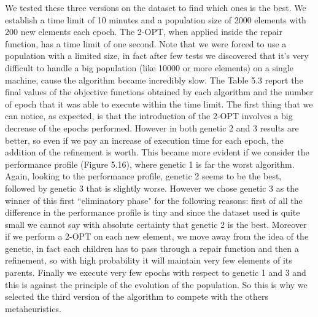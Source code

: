 \noindent We tested these three versions on the dataset to find which ones is the best. We establish a time limit of 10 minutes and a population size of 2000 elements with 200 new elements each epoch. The 2-OPT, when applied inside the repair function, has a time limit of one second. Note that we were forced to use a population with a limited size, in fact after few tests we discovered that it's very difficult to handle a big population (like 10000 or more elements) on a single machine, cause the algorithm became incredibly slow.
The Table 5.3 report the final values of the objective functions obtained by each algorithm and the number of epoch that it was able to execute within the time limit. The first thing that we can notice, as expected, is that the introduction of the 2-OPT involves a big decrease of the epochs performed. However in both genetic 2 and 3 results are better, so even if we pay an increase of execution time for each epoch, the addition of the refinement is worth. This became more evident if we consider the performance profile (Figure 5.16), where genetic 1 is far the worst algorithm. \\ 
Again, looking to the performance profile, genetic 2 seems to be the best, followed by genetic 3 that is slightly worse. However we chose genetic 3 as the winner of this first ``eliminatory phase" for the following reasons: first of all the difference in the performance profile is tiny and since the dataset used is quite small we cannot say with absolute certainty that genetic 2 is the best. Moreover if we perform a 2-OPT on each new element, we move away from the idea of the genetic, in fact each children has to pass through a repair function and then a refinement, so with high probability it will maintain very few elements of its parents. Finally we execute very few epochs with respect to genetic 1 and 3 and this is against the principle of the evolution of the population. So this is why we selected the third version of the algorithm to compete with the others metaheuristics.\\

